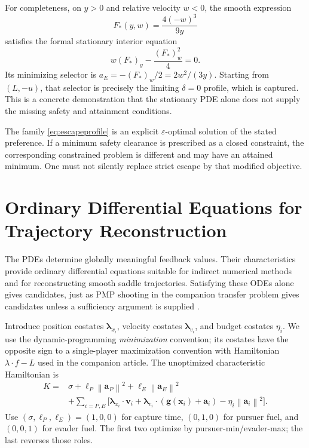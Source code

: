 \documentclass[journal,a4paper]{IEEEtran}
\newcommand{\norm}[1]{\left\|#1\right\|}
\begin{document}
For completeness, on $y>0$ and relative velocity $w<0$, the smooth expression
\begin{equation}
 F_*(y,w)=\frac{4(-w)^3}{9y}
\end{equation}
satisfies the formal stationary interior equation
\begin{equation}
 w(F_*)_y-\frac{(F_*)_w^2}{4}=0.
\end{equation}
Its minimizing selector is $a_E=-(F_*)_w/2=2w^2/(3y)$. Starting from $(L,-u)$, that selector is precisely the limiting $\delta=0$ profile, which is captured. This is a concrete demonstration that the stationary PDE alone does not supply the missing safety and attainment conditions.

The family \eqref{eq:escapeprofile} is an explicit $\varepsilon$-optimal solution of the stated preference. If a minimum safety clearance is prescribed as a closed constraint, the corresponding constrained problem is different and may have an attained minimum. One must not silently replace strict escape by that modified objective.

\section{Ordinary Differential Equations for Trajectory Reconstruction}
\label{sec:characteristics}
The PDEs determine globally meaningful feedback values. Their characteristics provide ordinary differential equations suitable for indirect numerical methods and for reconstructing smooth saddle trajectories. Satisfying these ODEs alone gives candidates, just as PMP shooting in the companion transfer problem gives candidates unless a sufficiency argument is supplied \cite{Pontryagin1962,OlsinaCompanion}.

Introduce position costates $\boldsymbol\lambda_{x_i}$, velocity costates $\boldsymbol\lambda_{v_i}$, and budget costates $\eta_i$. We use the dynamic-programming \emph{minimization} convention; its costates have the opposite sign to a single-player maximization convention with Hamiltonian $\lambda\cdot f-L$ used in the companion article. The unoptimized characteristic Hamiltonian is
\begin{align}
 K={}&\sigma+\ell_P\norm{\mathbf a_P}^2
                  +\ell_E\norm{\mathbf a_E}^2\nonumber\\
 &+\sum_{i=P,E}\big[\boldsymbol\lambda_{x_i}\cdot\mathbf v_i
   +\boldsymbol\lambda_{v_i}\cdot(\mathbf g(\mathbf x_i)+\mathbf a_i)
   -\eta_i\norm{\mathbf a_i}^2\big].
 \label{eq:canonicalH}
\end{align}
Use $(\sigma,\ell_P,\ell_E)=(1,0,0)$ for capture time, $(0,1,0)$ for pursuer fuel, and $(0,0,1)$ for evader fuel. The first two optimize by pursuer-min/evader-max; the last reverses those roles.
\end{document}
